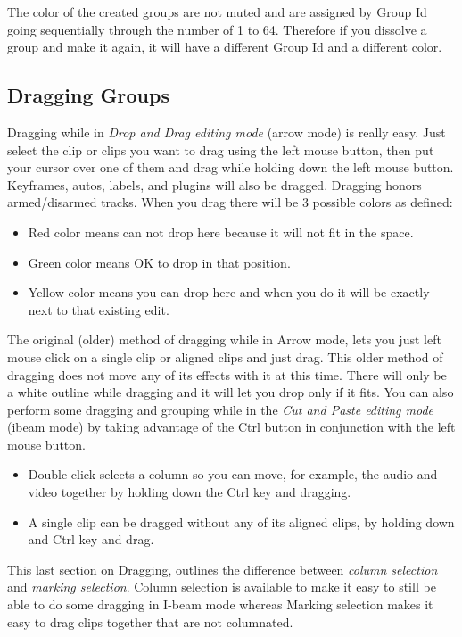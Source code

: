 The color of the created groups are not muted and are assigned by Group Id going sequentially through the number of 1 to 64.  Therefore if you dissolve a group and make it again, it will have a different Group Id and a different color.

\subsection{Dragging Groups}%
\label{sub:dragging_groups}

Dragging while in \textit{Drop and Drag editing mode} (arrow mode) is really easy.  Just select the clip or clips you want to drag using the left mouse button, then put your cursor over one of them and drag while holding down the left mouse button.  Keyframes, autos, labels, and plugins will also be dragged.   Dragging honors armed/disarmed tracks.  When you drag there will be 3 possible colors as defined:
\begin{itemize}
    \item Red color means can not drop here because it will not fit in the space.
    \item Green color means OK to drop in that position.
    \item Yellow color means you can drop here and when you do it will be exactly next to that existing edit.
\end{itemize}
The original (older) method of dragging while in Arrow mode, lets you just left mouse click on a single clip or aligned clips and just drag.  This older method of dragging does not move any of its effects with it at this time.  There will only be a white outline while dragging and it will let you drop only if it fits.  You can also perform some dragging and grouping while in the \textit{Cut and Paste editing mode} (ibeam mode) by taking advantage of the Ctrl button in conjunction with the left mouse button.
\begin{itemize}
    \item Double click selects a column so you can move, for example, the audio and video together by holding
    down the Ctrl key and dragging.
    \item A single clip can be dragged without any of its aligned clips, by holding down and Ctrl key and drag.
\end{itemize}
This last section on Dragging, outlines the difference between \textit{column selection} and \textit{marking selection}.  Column selection is available to make it easy to still be able to do some dragging in I-beam mode whereas Marking selection makes it easy to drag clips together that are not columnated.

